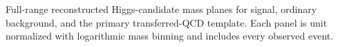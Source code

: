 Full-range reconstructed Higgs-candidate mass planes for signal, ordinary background, and the primary transferred-QCD template. Each panel is unit normalized with logarithmic mass binning and includes every observed event.
